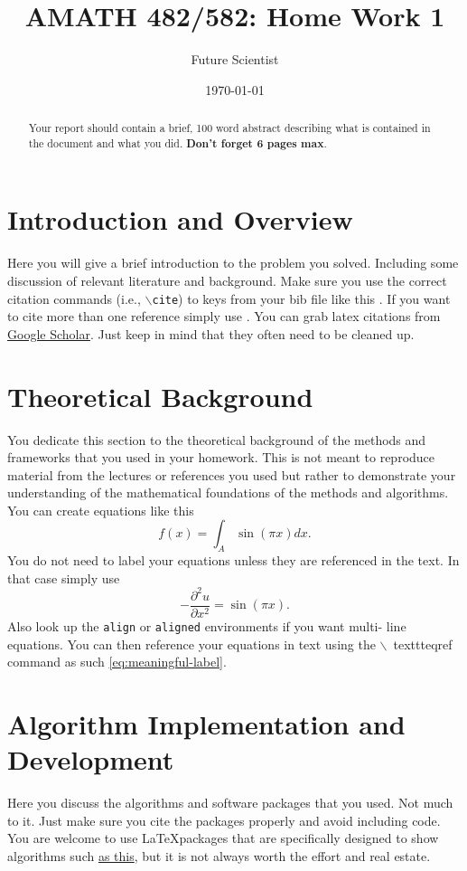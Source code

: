 \documentclass[11pt]{amsart}
\title{AMATH 482/582: Home Work 1}
\author{Future Scientist} %
\date{\today} %
\begin{document}
\maketitle
\begin{abstract}
Your report should contain a brief, 100 word abstract describing what is
contained in
the document and what you did. {\bf Don't forget 6 pages max}.
\end{abstract}
\section{Introduction and Overview}\label{sec:Introduction}
Here you will give a brief introduction to the problem you solved. Including
some discussion of relevant literature and background.
Make sure you use the correct citation commands (i.e., \texttt{$\backslash$cite})
to keys
from your bib file like this \cite{example-article-citation}. If you want
to cite more than one reference simply use \cite{example-article-citation, example-
book-citation}. You can grab latex citations
from \href{https://scholar.google.com}{Google Scholar}. Just keep in mind that they
often
need to be cleaned up.
\section{Theoretical Background}\label{sec:theory}
You dedicate this section to the theoretical background of the methods and
frameworks
that you used in your homework. This is not meant to reproduce material from the
lectures
or references you used but rather to demonstrate your understanding of the
mathematical foundations of the methods and algorithms. You can create equations
like this
\begin{equation*}
f(x) = \int_A \sin( \pi x) dx.
\end{equation*}
You do not need to label your equations unless they are referenced in the text. In
that
case simply use
\begin{equation}\label{eq:meaningful-label}
- \frac{\partial^2 u}{\partial x^2} = \sin ( \pi x).
\end{equation}
Also look up the \texttt{align} or \texttt{aligned} environments if you want multi-
line
equations. You can then reference your equations in text using the $\backslash$\
texttt{eqref}
command as such \eqref{eq:meaningful-label}.
\section{Algorithm Implementation and Development}\label{sec:algorithms}
Here you discuss the algorithms and software packages that you used. Not much to
it.
Just make sure you cite the packages properly and avoid including code.
You are welcome to use \LaTeX packages that are specifically designed to show
algorithms such \href{https://www.overleaf.com/learn/latex/Algorithms}{as this},
but it is
not always worth the effort and real estate.
\end{document}
